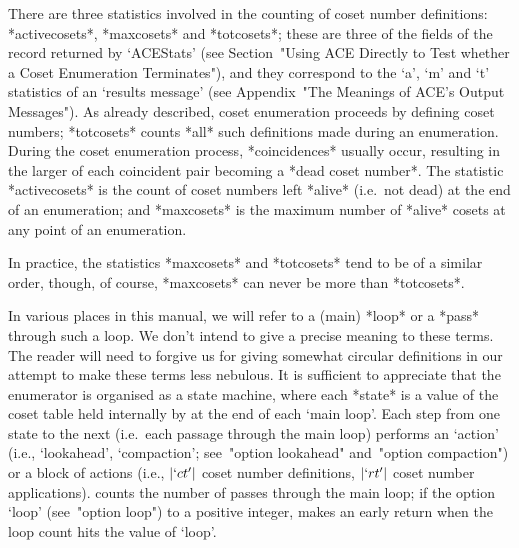 
There are three statistics involved in the counting  of  coset  number
definitions:                       *activecosets*,
*maxcosets* and  *totcosets*;  these
are three of the fields of the  record  returned  by  `ACEStats'  (see
Section~"Using ACE  Directly  to  Test  whether  a  Coset  Enumeration
Terminates"), and they correspond to the `a', `m' and  `t'  statistics
of an {\ACE} \lq{}results  message'  (see  Appendix~"The  Meanings  of
ACE's Output  Messages").  As  already  described,  coset  enumeration
proceeds by defining coset  numbers;  *totcosets*  counts  *all*  such
definitions made during an enumeration. During the  coset  enumeration
process, *coincidences* usually occur, resulting in
the  larger  of  each  coincident  pair   becoming   a   *dead   coset
number*. The  statistic  *activecosets*  is
the count of coset  numbers  left  *alive*
(i.e.~not dead) at the end of an enumeration; and *maxcosets*  is  the
maximum number of *alive* cosets at any point of an enumeration.

In practice, the statistics *maxcosets* and *totcosets* tend to be  of
a similar order, though, of course, *maxcosets* can never be more than
*totcosets*.


In  various  places  in  this  manual,  we  will  refer  to  a  (main)
*loop* or a *pass* through  such  a  loop.  We
don't intend to give a precise meaning to these terms. The reader will
need to forgive us for giving somewhat  circular  definitions  in  our
attempt to make  these  terms  less  nebulous.  It  is  sufficient  to
appreciate that the {\ACE} enumerator is organised as a state machine,
where each *state* is  a  value  of  the  coset
table held internally by {\ACE} at the end of  each  \lq{}main  loop'.
Each step from one state to the next (i.e.~each  passage  through  the
main loop) performs an \lq{}action' (i.e., `lookahead',  `compaction';
see~"option lookahead" and~"option compaction") or a block of  actions
(i.e.,  $|`ct'|$  coset  number  definitions,  $|`rt'|$  coset  number
applications). {\ACE} counts the number of  passes  through  the  main
loop; if the option `loop' (see~"option loop") to a positive  integer,
{\ACE} makes an early return when the loop count  hits  the  value  of
`loop'.


